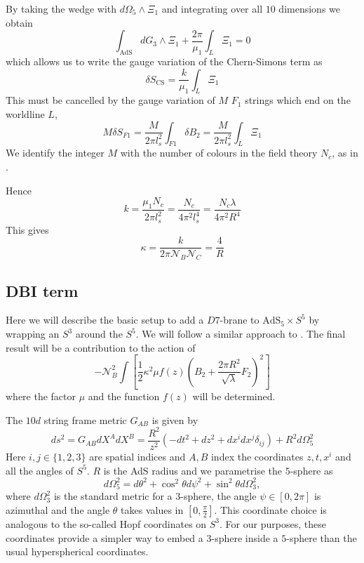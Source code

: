 \documentclass[aps,preprint,nofootinbib,preprintnumbers,eqsecnum,superscriptaddress]{revtex4}
\begin{document}
\begin{appendix}
By taking the wedge with $d\Omega_5 \wedge \Xi_1$ and integrating over all $10$ dimensions we obtain
\begin{equation}
\int_{\text{AdS}}{dG_3 \wedge \Xi_1} + \frac{2\pi}{\mu_1} \int_L \Xi_1 = 0
\end{equation}
which allows us to write the gauge variation of the Chern-Simons term as
\begin{equation}
\delta S_{\text{CS}} = \frac{k}{\mu_1} \int_L{\Xi_1}
\end{equation}
This must be cancelled by the gauge variation of $M$ $F_1$ strings which end on the worldline $L$,
\begin{equation}
M \delta S_{F1} = \frac{M}{2\pi l_s^2} \int_{F1}{\delta B_2} =  \frac{M}{2\pi l_s^2} \int_{L}{\Xi_1}
\end{equation}
We identify the integer $M$ with the number of colours in the field theory $N_c$, as in \cite{Witten:1998xy}.

Hence 
\begin{equation}
k = \frac{\mu_1 N_c}{2 \pi l_s^2} = \frac{N_c}{4\pi^2 l_s^4} = \frac{N_c \lambda}{4\pi^2 R^4}
\end{equation}
This gives
\begin{equation}
\kappa = \frac{k}{2\pi \mathcal{N}_B \mathcal{N}_C} = \frac{4}{R}
\end{equation}
\subsection{DBI term}
\label{DBI appendix}
Here we will describe the basic setup to add a $D7$-brane to $\text{AdS}_5 \times S^5$ by wrapping an $S^3$ around the $S^5$. We will follow a similar approach to \cite{Karch:2007pd}. The final result will be a contribution to the action of
\begin{equation}
	-\mathcal{N}_B^2 \int{\left[\frac{1}{2}\kappa^2 \mu f(z) \left(B_2 + \frac{2 \pi R^2}{\sqrt{\lambda}}F_2\right)^2\right]}
\end{equation}
where the factor $\mu$ and the function $f(z)$ will be determined.

The  $10d$ string frame metric $G_{AB}$ is given by
\begin{equation}
ds^2 = G_{AB}dX^A dX^B = \frac{R^2}{z^2} (-dt^2 + dz^2 + dx^i dx^j \delta_{ij}) + R^2 d\Omega_5^2
\end{equation}
Here $i, j \in \{1,2,3\}$ are spatial indices and $A, B$ index the coordinates $z, t, x^i$ and all the angles of $S^5$. $R$ is the AdS radius and we parametrise the $5$-sphere as
\begin{equation}
d\Omega_5^2 = d\theta^2 + \cos^2{\theta} d\psi^2 + \sin^2{\theta} d\Omega_3^2,
\end{equation}
where $d\Omega_3^2$ is the standard metric for a $3$-sphere, the angle $\psi \in [0, 2\pi]$ is azimuthal and the angle $\theta$ takes values in $[0, \frac{\pi}{2}]$. This coordinate choice is analogous to the so-called Hopf coordinates on $S^3$. For our purposes, these coordinates provide a simpler way to embed a $3$-sphere inside a $5$-sphere than the usual hyperspherical coordinates.


\end{appendix}
\end{document}
